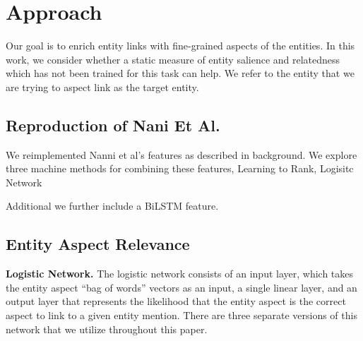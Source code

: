 \section{Approach}
\label{sec:Approach}
Our goal is to enrich entity links with fine-grained aspects of the entities. In this work, we consider whether a static measure of entity salience and relatedness which has not been trained for this task can help. We refer to the entity that we are trying to aspect link as the target entity.


\subsection{Reproduction of Nani Et Al.}

We reimplemented Nanni et al's features as described in background. We explore three machine methods for combining these features, Learning to Rank, Logisitc Network

Additional we further include a BiLSTM feature.



\subsection{Entity Aspect Relevance}

\textbf{Logistic Network. }The logistic network consists of an input layer, which takes the entity aspect ``bag of words'' vectors as an input, a single linear layer, and an output layer that represents the likelihood that the entity aspect is the correct aspect to link to a given entity mention. There are three separate versions of this network that we utilize throughout this paper. 


